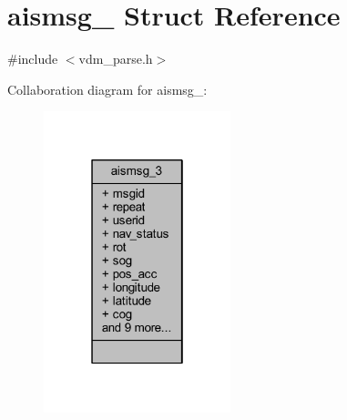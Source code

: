 \hypertarget{structaismsg__3}{}\section{aismsg\+\_ Struct Reference}
\label{structaismsg__3}


{\ttfamily \#include $<$vdm\+\_\+parse.\+h$>$}



Collaboration diagram for aismsg\+\_\+:
\nopagebreak
\begin{figure}[H]
\begin{center}
\leavevmode
\includegraphics[width=154pt]{structaismsg__3__coll__graph}
\end{center}
\end{figure}
